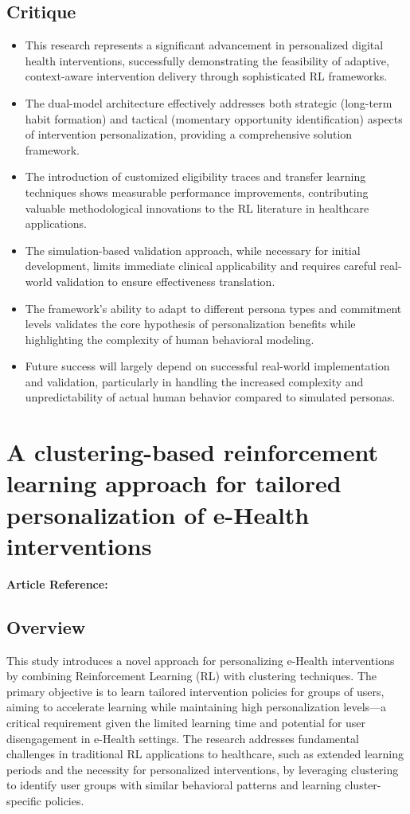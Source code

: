 \subsection*{Critique}
\begin{itemize}
    \item This research represents a significant advancement in personalized digital health interventions, successfully demonstrating the feasibility of adaptive, context-aware intervention delivery through sophisticated RL frameworks.
    \item The dual-model architecture effectively addresses both strategic (long-term habit formation) and tactical (momentary opportunity identification) aspects of intervention personalization, providing a comprehensive solution framework.
    \item The introduction of customized eligibility traces and transfer learning techniques shows measurable performance improvements, contributing valuable methodological innovations to the RL literature in healthcare applications.
    \item The simulation-based validation approach, while necessary for initial development, limits immediate clinical applicability and requires careful real-world validation to ensure effectiveness translation.
    \item The framework's ability to adapt to different persona types and commitment levels validates the core hypothesis of personalization benefits while highlighting the complexity of human behavioral modeling.
    \item Future success will largely depend on successful real-world implementation and validation, particularly in handling the increased complexity and unpredictability of actual human behavior compared to simulated personas.
\end{itemize}


\section{A clustering-based reinforcement learning approach for tailored personalization of e-Health interventions}
\textbf{Article Reference:} \cite{hassouniClusteringbasedReinforcementLearning2020}

\subsection*{Overview}
This study introduces a novel approach for personalizing e-Health interventions by combining Reinforcement Learning (RL) with clustering techniques. The primary objective is to learn tailored intervention policies for groups of users, aiming to accelerate learning while maintaining high personalization levels—a critical requirement given the limited learning time and potential for user disengagement in e-Health settings. The research addresses fundamental challenges in traditional RL applications to healthcare, such as extended learning periods and the necessity for personalized interventions, by leveraging clustering to identify user groups with similar behavioral patterns and learning cluster-specific policies.

